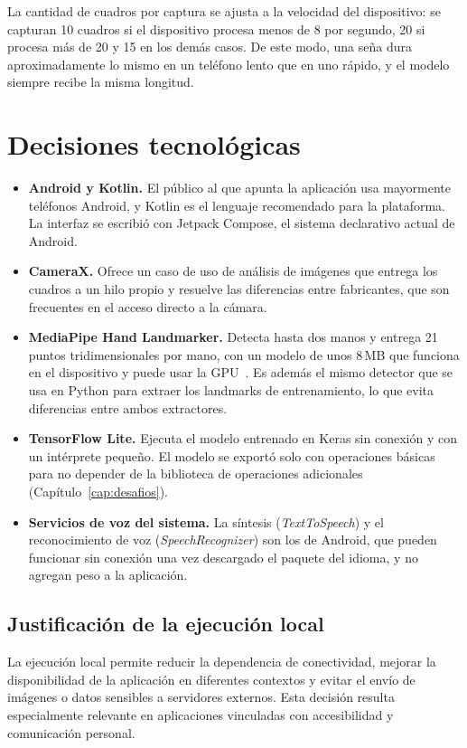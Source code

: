 La cantidad de cuadros por captura se ajusta a la velocidad del dispositivo: se capturan 10 cuadros si el dispositivo procesa menos de 8 por segundo, 20 si procesa más de 20 y 15 en los demás casos. De este modo, una seña dura aproximadamente lo mismo en un teléfono lento que en uno rápido, y el modelo siempre recibe la misma longitud.

\section{Decisiones tecnológicas}

\begin{itemize}
    \item \textbf{Android y Kotlin.} El público al que apunta la aplicación usa mayormente teléfonos Android, y Kotlin es el lenguaje recomendado para la plataforma. La interfaz se escribió con Jetpack Compose, el sistema declarativo actual de Android.
    \item \textbf{CameraX.} Ofrece un caso de uso de análisis de imágenes que entrega los cuadros a un hilo propio y resuelve las diferencias entre fabricantes, que son frecuentes en el acceso directo a la cámara.
    \item \textbf{MediaPipe Hand Landmarker.} Detecta hasta dos manos y entrega 21 puntos tridimensionales por mano, con un modelo de unos 8\,MB que funciona en el dispositivo y puede usar la GPU~\cite{zhang2020mediapipehands}. Es además el mismo detector que se usa en Python para extraer los landmarks de entrenamiento, lo que evita diferencias entre ambos extractores.
    \item \textbf{TensorFlow Lite.} Ejecuta el modelo entrenado en Keras sin conexión y con un intérprete pequeño. El modelo se exportó solo con operaciones básicas para no depender de la biblioteca de operaciones adicionales (Capítulo~\ref{cap:desafios}).
    \item \textbf{Servicios de voz del sistema.} La síntesis (\emph{TextToSpeech}) y el reconocimiento de voz (\emph{SpeechRecognizer}) son los de Android, que pueden funcionar sin conexión una vez descargado el paquete del idioma, y no agregan peso a la aplicación.
\end{itemize}

\subsection{Justificación de la ejecución local}

La ejecución local permite reducir la dependencia de conectividad, mejorar la disponibilidad de la aplicación en diferentes contextos y evitar el envío de imágenes o datos sensibles a servidores externos. Esta decisión resulta especialmente relevante en aplicaciones vinculadas con accesibilidad y comunicación personal.

